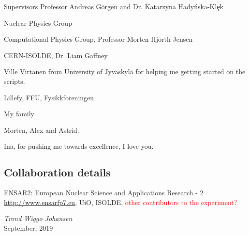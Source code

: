\documentclass[twoside,english]{uiofysmaster/uiofysmaster}
\begin{document}
\begin{acknowledgements}
Supervisors Professor Andreas Görgen and Dr. Katarzyna Hady{\'{n}}ska-Kl{\c{e}}k



Nuclear Physics Group

Computational Physics Group, Professor Morten Hjorth-Jensen

CERN-ISOLDE, Dr. Liam Gaffney

Ville Virtanen from University of Jyväskylä for helping me getting started on the scripts. 

Lillefy, FFU, Fysikkforeningen

My family

Morten, Alex and Astrid.

Ina, for pushing me towards excellence, I love you.

\subsection*{Collaboration details}


ENSAR2: European Nuclear Science and Applications Research - 2 \url{http://www.ensarfp7.eu}, UiO, ISOLDE, \textcolor{red}{other contributors to the experiment?}



  \vspace{1.5cm}
  
  \noindent\textit{Trond Wiggo Johansen}\\
  
  \noindent September, 2019


\vspace{1cm}


\end{acknowledgements}
\end{document}
